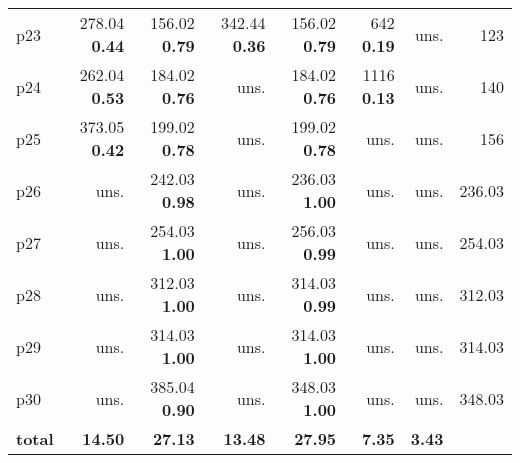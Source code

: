 \begin{tabular}{|l|rrrrrr|r|}
p23 & {\footnotesize 278.04} \textbf{0.44} & {\footnotesize 156.02} \textbf{0.79} & {\footnotesize 342.44} \textbf{0.36} & {\footnotesize 156.02} \textbf{0.79} & {\footnotesize 642} \textbf{0.19} & uns. & 123\\
p24 & {\footnotesize 262.04} \textbf{0.53} & {\footnotesize 184.02} \textbf{0.76} & uns. & {\footnotesize 184.02} \textbf{0.76} & {\footnotesize 1116} \textbf{0.13} & uns. & 140\\
p25 & {\footnotesize 373.05} \textbf{0.42} & {\footnotesize 199.02} \textbf{0.78} & uns. & {\footnotesize 199.02} \textbf{0.78} & uns. & uns. & 156\\
p26 & uns. & {\footnotesize 242.03} \textbf{0.98} & uns. & {\footnotesize 236.03} \textbf{1.00} & uns. & uns. & 236.03\\
p27 & uns. & {\footnotesize 254.03} \textbf{1.00} & uns. & {\footnotesize 256.03} \textbf{0.99} & uns. & uns. & 254.03\\
p28 & uns. & {\footnotesize 312.03} \textbf{1.00} & uns. & {\footnotesize 314.03} \textbf{0.99} & uns. & uns. & 312.03\\
p29 & uns. & {\footnotesize 314.03} \textbf{1.00} & uns. & {\footnotesize 314.03} \textbf{1.00} & uns. & uns. & 314.03\\
p30 & uns. & {\footnotesize 385.04} \textbf{0.90} & uns. & {\footnotesize 348.03} \textbf{1.00} & uns. & uns. & 348.03\\
\hline
\textbf{total} & \textbf{14.50} & \textbf{27.13} & \textbf{13.48} & \textbf{27.95} & \textbf{7.35} & \textbf{3.43} & \\
\hline
\end{tabular}

